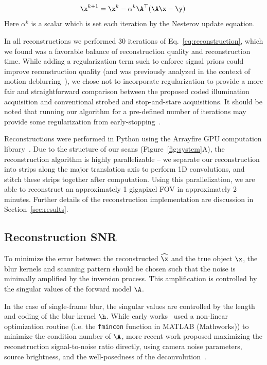 \begin{equation}
    \label{eq:reconstruction}
    \x^{k+1} = \x^k - \alpha^k \A^\top (\A\x - \y)\:
\end{equation}
Here $\alpha^k$ is a scalar which is set each iteration by the Nesterov update equation.

In all reconstructions we performed 30 iterations of Eq.~\ref{eq:reconstruction}, which we found was a favorable balance of reconstruction quality and reconstruction time. While adding a regularization term such to enforce signal priors could improve reconstruction quality (and was previously analyzed in the context of motion deblurring~\cite{mitra:2014}), we chose not to incorporate regularization to provide a more fair and straightforward comparison between the proposed coded illumination acquisition and conventional strobed and stop-and-stare acquisitions. It should be noted that running our algorithm for a pre-defined number of iterations may provide some regularization from early-stopping~\cite{hagiwara2000regularization}.

Reconstructions were performed in Python using the Arrayfire GPU computation library~\cite{Yalamanchili2015}.
Due to the structure of our scans (Figure~\ref{fig:system}A), the reconstruction algorithm is highly parallelizable -- we separate our reconstruction into strips along the major translation axis to perform 1D convolutions, and stitch these strips together after computation.
Using this parallelization, we are able to reconstruct an approximately 1 gigapixel FOV in approximately 2 minutes. Further details of the reconstruction implementation are discussion in Section~\ref{sec:results}.

\subsection{Reconstruction SNR}\label{sec:methods_snr}

To minimize the error between the reconstructed $\widehat \x$ and the true object $\x$, the blur kernels and scanning pattern should be chosen such that the noise is minimally amplified by the inversion process. This amplification is controlled by the singular values of the forward model $\A$.

In the case of single-frame blur, the singular values are controlled by the length and coding of the blur kernel $\h$.
While early works~\cite{raskar2006coded, Ma:15} used a non-linear optimization routine (i.e. the \texttt{fmincon} function in MATLAB (Mathworks)) to minimize the condition number of $\A$, more recent work proposed maximizing the reconstruction signal-to-noise ratio directly, using camera noise parameters, source brightness, and the well-posedness of the deconvolution~\cite{agrawal2009optimal, cossairt2013does}.

